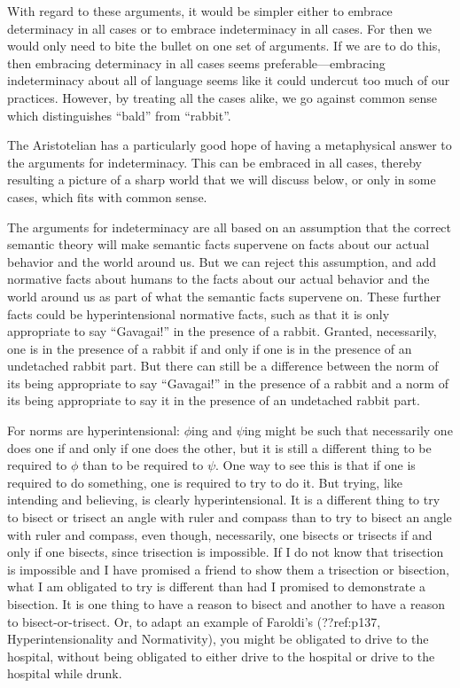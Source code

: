 With regard to these arguments, it would be simpler either to embrace determinacy in all cases or to embrace indeterminacy in all 
cases. For then we would only need to bite the bullet on one set of arguments. If we are to do this, then embracing determinacy in
all cases seems preferable---embracing indeterminacy about all of language seems like it could undercut too much of our practices.
However, by treating all the cases alike, we go against common sense which distinguishes ``bald'' from ``rabbit''. 

The Aristotelian has a particularly good hope of having a metaphysical answer to the arguments for indeterminacy. This can be embraced
in all cases, thereby resulting a picture of a sharp world that we will discuss below, or only in some cases, which fits with 
common sense. 

The arguments for indeterminacy are all based on an assumption that the correct semantic theory will make semantic facts supervene on
facts about our actual behavior and the world around us. But we can reject this assumption, and add normative facts about humans 
to the facts about our actual behavior and the world around us as part of what the semantic facts supervene on. These further
facts could be hyperintensional normative
facts, such as that it is only appropriate to say ``Gavagai!'' in the presence of a rabbit. Granted, necessarily, one is in the
presence of a rabbit if and only if one is in the presence of an undetached rabbit part. But there can still be a difference between
the norm of its being appropriate to say ``Gavagai!'' in the presence of a rabbit and a norm of its being appropriate to say it 
in the presence of an undetached rabbit part.

For norms are hyperintensional: $\phi$ing and $\psi$ing might be such that necessarily one does one if and only if one does the other,
but it is still a different thing to be required to $\phi$ than to be required to $\psi$. One way to see this is that if one
is required to do something, one is required to try to do it. But trying, like intending and believing, is clearly hyperintensional.
It is a different thing to try to bisect or trisect an angle with ruler and compass than to try to bisect an angle with ruler and 
compass, even though, necessarily, one bisects or trisects if and only if one bisects, since trisection is impossible. If I do not
know that trisection is impossible and I have promised a friend to show them a trisection or bisection, what I am obligated to try
is different than had I promised to demonstrate a bisection. 
It is one thing to have a reason to bisect and another to have a reason to bisect-or-trisect. Or, to adapt an example of 
Faroldi's (??ref:p137, Hyperintensionality
and Normativity), you might be obligated to drive to the hospital, without being obligated to either drive to the hospital or 
drive to the hospital while drunk. 

